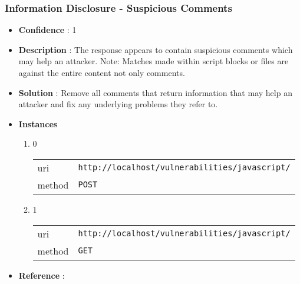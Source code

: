 \documentclass[10pt]{article}
\begin{document}
\subsubsection{Information Disclosure - Suspicious Comments}
\begin{itemize}
\item[] \textbf{Confidence} : 1
\item[] \textbf{Description} : The response appears to contain suspicious comments which may help an attacker. Note: Matches made within script blocks or files are against the entire content not only comments.
\item[] \textbf{Solution} :  Remove all comments that return information that may help an attacker and fix any underlying problems they refer to.
\item[] \textbf{Instances}
\begin{enumerate}
\item[] 0
\begin{tabular}{| l | p{12cm}}
uri & \texttt{http://localhost/vulnerabilities/javascript/} \\
method & \texttt{POST} \\
\end{tabular}
\item[] 1
\begin{tabular}{| l | p{12cm}}
uri & \texttt{http://localhost/vulnerabilities/javascript/} \\
method & \texttt{GET} \\
\end{tabular}
\end{enumerate}
\item[] \textbf{Reference} : 
\end{itemize}
\end{document}
